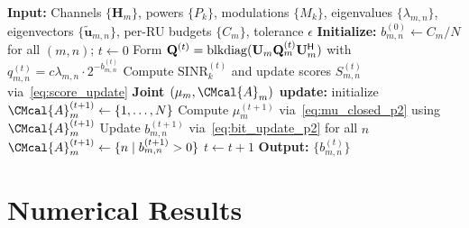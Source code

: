 \documentclass[10pt, twocolumn, comsoc]{IEEEtran}
\newtheorem{remark}{Remark}
\begin{document}
\begin{algorithm}[t]
\caption{Iterative RMWF for (P2)}
\label{alg:rmwf_p2}
\begin{algorithmic}[1]
\STATE \textbf{Input:} Channels $\{\mathbf{H}_m\}$, 
powers $\{P_k\}$, modulations $\{M_k\}$, 
eigenvalues $\{\lambda_{m,n}\}$, eigenvectors 
$\{\mathbf{\tilde u}_{m,n}\}$, per-RU budgets $\{C_m\}$, 
tolerance $\epsilon$
\STATE \textbf{Initialize:} $b_{m,n}^{(0)} 
\leftarrow C_m/N$ for all $(m, n)$; $t \leftarrow 0$
\REPEAT
  \STATE Form $\mathbf{Q}^{(t)} = 
         \mathrm{blkdiag}(\mathbf{U}_m \mathbf{Q}_m^{(t)} 
         \mathbf{U}_m^{\sf H})$ with 
         $q_{m,n}^{(t)} = c \lambda_{m,n} \cdot 
         2^{-b_{m,n}^{(t)}}$
  \STATE Compute $\mathrm{SINR}_k^{(t)}$ 
         and update scores $S_{m,n}^{(t)}$ 
         via~\eqref{eq:score_update}
    \STATE \textbf{Joint $(\mu_m, \CMcal{A}_m)$ update:} 
           initialize $\CMcal{A}_m^{(t+1)} \leftarrow 
           \{1, \dots, N\}$
    \REPEAT
      \STATE Compute $\mu_m^{(t+1)}$ 
             via~\eqref{eq:mu_closed_p2} using 
             $\CMcal{A}_m^{(t+1)}$
      \STATE Update $b_{m,n}^{(t+1)}$ 
             via~\eqref{eq:bit_update_p2} for all $n$
      \STATE $\CMcal{A}_m^{(t+1)} \leftarrow 
             \{n \mid b_{m,n}^{(t+1)} > 0\}$
  \ENDFOR
  \STATE $t \leftarrow t + 1$
\STATE \textbf{Output:} $\{b_{m,n}^{(t)}\}$
\end{algorithmic}
\end{algorithm}





\section{Numerical Results}\label{sec:numerical}
\end{document}
